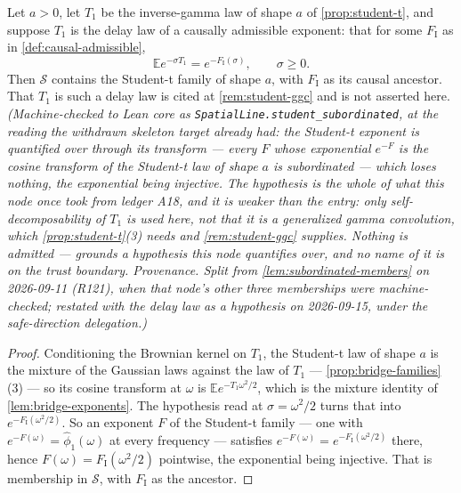 \begin{lemma}\label{lem:student-subordinated}
\leanok
{}
Let $a > 0$, let $T_1$ be the inverse-gamma law of shape $a$ of \ref{prop:student-t}, and suppose
$T_1$ is the delay law of a causally admissible exponent: that for some $F_{\mathrm I}$ as in
\ref{def:causal-admissible},
\[
  \mathbb{E}e^{-\sigma T_1} = e^{-F_{\mathrm I}(\sigma)}, \qquad \sigma \ge 0 .
\]
Then $\mathcal{S}$ contains the Student-t family of shape $a$, with $F_{\mathrm I}$ as its causal
ancestor. That $T_1$ is such a delay law is cited at \ref{rem:student-ggc} and is not asserted
here.
\statusT\quad\emph{(Machine-checked to Lean core as
\texttt{SpatialLine.student\_subordinated}, at the reading the withdrawn skeleton target already
had: the Student-t exponent is quantified over through its transform --- every $F$ whose
exponential $e^{-F}$ is the cosine transform of the Student-t law of shape $a$ is subordinated
--- which loses nothing, the exponential being injective. The hypothesis is the whole of what
this node once took from ledger A18, and it is weaker than the entry: only self-decomposability
of $T_1$ is used here, not that it is a generalized gamma convolution, which
\ref{prop:student-t}(3) needs and \ref{rem:student-ggc} supplies. Nothing is admitted ---
 grounds a hypothesis this node quantifies over, and no name of it is on the trust
boundary.
\emph{Provenance.} Split from \ref{lem:subordinated-members} on 2026-09-11 (R121), when that
node's other three memberships were machine-checked; restated with the delay law as a hypothesis
on 2026-09-15, under the safe-direction delegation.)}
\end{lemma}

\begin{proof}\leanok
Conditioning the Brownian kernel on $T_1$, the Student-t law of shape $a$ is the mixture of the
Gaussian laws against the law of $T_1$ --- \ref{prop:bridge-families}(3) --- so its cosine
transform at $\omega$ is $\mathbb{E}e^{-T_1\omega^2/2}$, which is the mixture identity of
\ref{lem:bridge-exponents}. The hypothesis read at $\sigma = \omega^2/2$ turns that into
$e^{-F_{\mathrm I}(\omega^2/2)}$. So an exponent $F$ of the Student-t family --- one with
$e^{-F(\omega)} = \hat\phi_1(\omega)$ at every frequency --- satisfies
$e^{-F(\omega)} = e^{-F_{\mathrm I}(\omega^2/2)}$ there, hence
$F(\omega) = F_{\mathrm I}(\omega^2/2)$ pointwise, the exponential being injective. That is
membership in $\mathcal{S}$, with $F_{\mathrm I}$ as the ancestor.
\end{proof}

